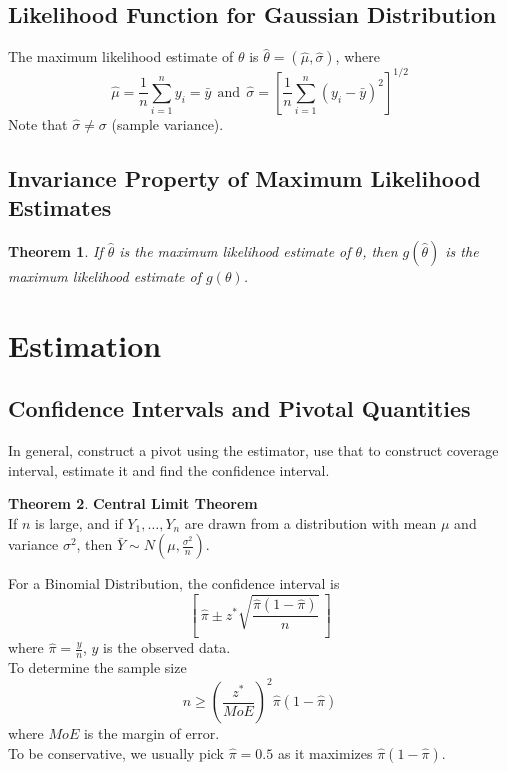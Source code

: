 \documentclass[12pt, leqno]{article}
\theoremstyle{definition}
\newtheorem*{theorem}{Theorem}
\begin{document}
  \subsection{Likelihood Function for Gaussian Distribution}
  The maximum likelihood estimate of $\theta$ is $\hat{\theta} = (\hat{\mu}, \hat{\sigma})$, where
  $$
  \hat{\mu} = \frac{1}{n}\sum_{i=1}^{n}y_{i} = \bar{y}
  ~~\text{and}~~
  \hat{\sigma} = \left[\frac{1}{n}\sum_{i=1}^{n}(y_{i} - \bar{y})^{2}\right]^{1/2}
  $$
  Note that $\hat{\sigma} \not = \sigma$ (sample variance).

  \subsection{Invariance Property of Maximum Likelihood Estimates}
  \begin{theorem}
    \emph{If $\hat{\theta}$ is the maximum likelihood estimate of $\theta$, then $g(\hat{\theta})$ is the maximum likelihood estimate of $g(\theta)$.}
  \end{theorem}

  \newpage
  \section{Estimation}
  \subsection{Confidence Intervals and Pivotal Quantities}
  In general, construct a pivot using the estimator, use that to construct coverage interval, estimate it and find the confidence interval.

  \begin{theorem}
  \textbf{Central Limit Theorem} \\
    If $n$ is large, and if $Y_{1}, \dots, Y_{n}$ are drawn from a distribution with mean $\mu$ and variance $\sigma^{2}$, then $\bar{Y} \sim N\left(\mu, \frac{\sigma^{2}}{n}\right)$.
  \end{theorem}

  For a Binomial Distribution, the confidence interval is
  $$\left[~\hat{\pi} \pm z^{*}\sqrt{\frac{\hat{\pi}(1 - \hat{\pi})}{n}}~\right]$$
  where $\hat{\pi} = \frac{y}{n}$, $y$ is the observed data. \\
  To determine the sample size
  $$n \geq \left(\frac{z^{*}}{MoE}\right)^{2}\hat{\pi}(1 - \hat{\pi})$$
  where $MoE$ is the margin of error. \\
  To be conservative, we usually pick $\hat{\pi} = 0.5$ as it maximizes $\hat{\pi}(1 - \hat{\pi})$.
\end{document}
